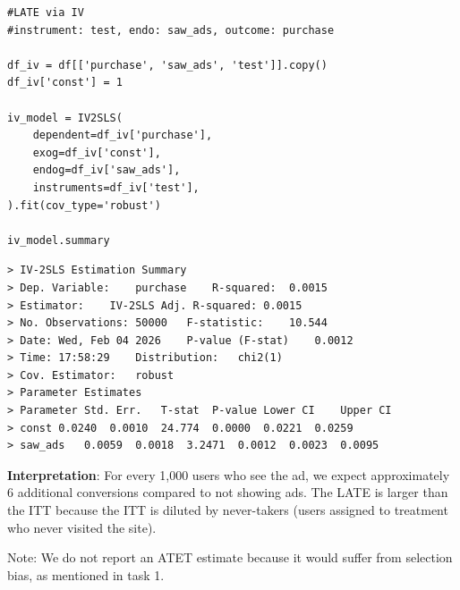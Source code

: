 \documentclass[10pt]{article}
\begin{document}
\begin{lstlisting}
#LATE via IV
#instrument: test, endo: saw_ads, outcome: purchase 

df_iv = df[['purchase', 'saw_ads', 'test']].copy()
df_iv['const'] = 1 

iv_model = IV2SLS(
    dependent=df_iv['purchase'],
    exog=df_iv['const'],
    endog=df_iv['saw_ads'],
    instruments=df_iv['test'],
).fit(cov_type='robust')

iv_model.summary
\end{lstlisting}
\newpage 
\begin{verbatim}
> IV-2SLS Estimation Summary
> Dep. Variable:	purchase	R-squared:	0.0015
> Estimator:	IV-2SLS	Adj. R-squared:	0.0015
> No. Observations:	50000	F-statistic:	10.544
> Date:	Wed, Feb 04 2026	P-value (F-stat)	0.0012
> Time:	17:58:29	Distribution:	chi2(1)
> Cov. Estimator:	robust		
> Parameter Estimates
> Parameter	Std. Err.	T-stat	P-value	Lower CI	Upper CI
> const	0.0240	0.0010	24.774	0.0000	0.0221	0.0259
> saw_ads	0.0059	0.0018	3.2471	0.0012	0.0023	0.0095

\end{verbatim}

\textbf{Interpretation}: For every 1,000 users who see the ad, we expect approximately 6 additional conversions compared to not showing ads. The LATE is larger than the ITT because the ITT is diluted by never-takers (users assigned to treatment who never visited the site). 

Note: We do not report an ATET estimate because it would suffer from selection bias, as mentioned in task 1.
\end{document}
